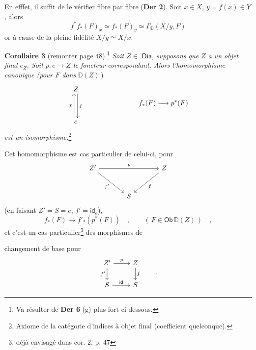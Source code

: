 \documentclass[11pt]{article}
\newcommand{\printedpage}[1]{\marginpar{\footnotesize p.~#1}}
\newcommand{\msp}[1]{\marginpar{\footnotesize [#1]}}
\newcommand{\Ob}{\mathsf{Ob}}
\newcommand{\Dia}{\mathsf{Dia}}
\newcommand{\id}{\mathsf{id}}
\newcommand{\D}{\mathbb{D}}
\begin{document}
En efffet, il suffit de le vérifier fibre par fibre (\textbf{Der 2}). Soit $x \in X$, $y = f(x) \in Y$, %
alors
\[ f^{*} f_{*}(F)_{x} \simeq f_{*}(F)_{y} \simeq \Gamma_{\D}(X/y, F) \]
or à cause de la pleine fidélité $X/y \simeq X/x$.

\noindent\textbf{Corollaire 3} (remonter page 48).\footnote[20]{Va résulter de \textbf{Der 6} (g) plus fort ci-dessous.} \textit{Soit $Z \in$} $\Dia$\textit{, supposons que $Z$ a un objet final $e_{Z}$. Soit $p : e \to Z$ le foncteur correspondant. Alors l'homomorphisme canonique (pour $F$ dans} $\D(Z)$\,)
\[
\begin{tikzcd}[row sep=huge]
Z \arrow[d, shift left=0.6ex, "f"] \\
e \arrow[u, shift left=0.6ex, "p"]
\end{tikzcd}
\qquad\qquad\qquad\qquad
f_{*}(F) \longrightarrow p^{*}(F)
\]
\textit{est un isomorphisme.}\footnote[21]{Axiome de la catégorie d'indices à objet final (coefficient quelconque).}

Cet homomorphisme est cas particulier de celui-ci, pour
\[
\begin{tikzcd}[row sep=large, column sep=large]
Z' \arrow[rr, "p"] \arrow[dr, "f'"'] & & Z \arrow[dl, "f"] \\
& S &
\end{tikzcd}
\]
(en faisant $Z' = S = e$, $f' = \mathsf{id}_{e}$),
\[ f_{*}(F) \longrightarrow f'_{*}(p^{*}(F)) \quad , \qquad (\, F \in \Ob\,\D(Z)\,) \quad , \]
et c'est un cas particulier\footnote[22]{déjà envisagé dans cor. 2, p. 47} des morphismes de


\printedpage{29}

\noindent\msp{page 51}
changement de base pour
\[
\begin{tikzcd}
Z' \arrow[r, "p"] \arrow[d, "f'"'] & Z \arrow[d, "f"] \\
S \arrow[r, "\id"] & S
\end{tikzcd}
\qquad .
\]
\end{document}

